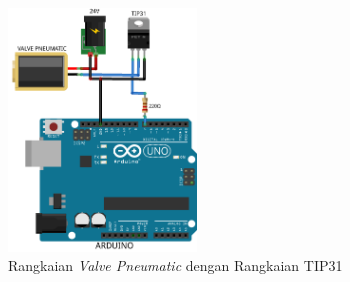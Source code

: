 \begin{figure}[H]
	\centering
	\includegraphics[width=5cm]{gambar/tip31.png}
	\caption{Rangkaian \textit{Valve Pneumatic} dengan Rangkaian TIP31}
	\label{pic.skematikvalve}
\end{figure}
